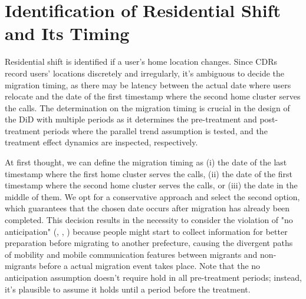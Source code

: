 \section{Identification of Residential Shift and Its Timing}\label{sec:identification_of_residential_shift}
Residential shift is identified if a user's home location changes.
Since CDRs record users' locations discretely and irregularly, it's ambiguous to decide the migration timing, as there may be latency between the actual date where users relocate and the date of the first timestamp where the second home cluster serves the calls. The determination on the migration timing is crucial in the design of the DiD with multiple periods as it determines the pre-treatment and post-treatment periods where the parallel trend assumption is tested, and the treatment effect dynamics are inspected, respectively.

At first thought, we can define the migration timing as (i) the date of the last timestamp where the first home cluster serves the calls, (ii) the date of the first timestamp where the second home cluster serves the calls, or (iii) the date in the middle of them. We opt for a conservative approach and select the second option, which guarantees that the chosen date occurs after migration has already been completed. This decision results in the necessity to consider the violation of "no anticipation" (\cite{callaway2021difference}, \cite{sun2021estimating}, \cite{borusyak2024revisiting}) because people might start to collect information for better preparation before migrating to another prefecture, causing the divergent paths of mobility and mobile communication features between migrants and non-migrants before a actual migration event takes place. Note that the no anticipation assumption doesn't require hold in all pre-treatment periods; instead, it's plausible to assume it holds until a period before the treatment.

